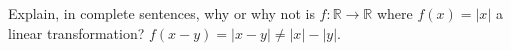 {Explain, in complete sentences, why or why not is $f:\mathbb{R}\to\mathbb{R}$ where $f(x) = |x|$ a linear transformation?
}
{$f(x-y) = |x-y| \neq |x|-|y|$.
}